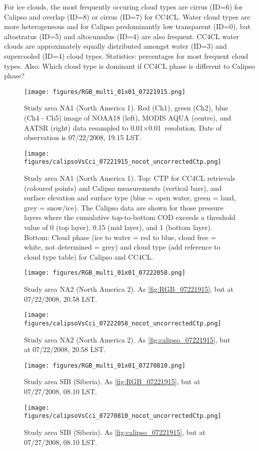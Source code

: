 For ice clouds, the most frequently occuring cloud types are cirrus (ID=6) for Calipso and overlap (ID=8) or cirrus (ID=7) for CC4CL. Water cloud types are more heterogeneous and for Calipso predominantly low transparent (ID=0), but altostratus (ID=5) and altocumulus (ID=4) are also frequent. CC4CL water clouds are approximately equally distributed amongst water (ID=3) and supercooled (ID=4) cloud types. Statistics: percentages for most frequent cloud types. Also: Which cloud type is dominant if CC4CL phase is different to Calipso phase?

\begin{figure*}[h]
  \texttt{[image: figures/RGB\_multi\_01x01\_07221915.png]}
  \caption{Study area NA1 (North America 1). Red (Ch1), green (Ch2), blue (Ch4 - Ch5) image of NOAA18 (left), MODIS AQUA (centre), and AATSR (right) data resampled to 0.01\textdegree$\times$0.01\textdegree\ resolution. Date of observation is 07/22/2008, 19.15 LST.}
  \label{fig:RGB_07221915}
  \texttt{[image: figures/calipsoVsCci\_07221915\_nocot\_uncorrectedCtp.png]}
  \caption{Study area NA1 (North America 1). Top: CTP for CC4CL retrievals (coloured points) and Calipso measurements (vertical bars), and surface elevation and surface type (blue = open water, green = land, grey = snow/ice). The Calipso data are shown for those pressure layers where the cumulative top-to-bottom COD exceeds a threshold value of 0 (top layer), 0.15 (mid layer), and 1 (bottom layer). Bottom: Cloud phase (ice to water = red to blue, cloud free = white, not determined = grey) and cloud type (add reference to cloud type table) for Calipso and CC4CL.}
  \label{fig:calipso_07221915}
\end{figure*}

\begin{figure*}[h]
  \texttt{[image: figures/RGB\_multi\_01x01\_07222058.png]}
  \caption{Study area NA2 (North America 2). As \autoref{fig:RGB_07221915}, but at 07/22/2008, 20.58 LST.}
  \label{fig:RGB_07222058}
  \texttt{[image: figures/calipsoVsCci\_07222058\_nocot\_uncorrectedCtp.png]}
  \caption{Study area NA2 (North America 2). As \autoref{fig:calipso_07221915}, but at 07/22/2008, 20.58 LST.}
  \label{fig:calipso_07222058}
\end{figure*}

\begin{figure*}[h]
  \texttt{[image: figures/RGB\_multi\_01x01\_07270810.png]}
  \caption{Study area SIB (Siberia). As \autoref{fig:RGB_07221915}, but at 07/27/2008, 08.10 LST.}
  \label{fig:RGB_07270810}
  \texttt{[image: figures/calipsoVsCci\_07270810\_nocot\_uncorrectedCtp.png]}
  \caption{Study area SIB (Siberia). As \autoref{fig:calipso_07221915}, but at 07/27/2008, 08.10 LST.}
  \label{fig:calipso_07271915}
\end{figure*}


